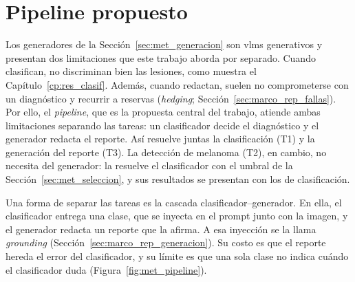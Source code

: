 \section{Pipeline propuesto}
\label{sec:met_pipeline}

Los generadores de la Sección~\ref{sec:met_generacion} son \glspl{vlm} generativos y presentan dos limitaciones que este
trabajo aborda por separado. Cuando clasifican, no discriminan bien las lesiones, como muestra el
Capítulo~\ref{cp:res_clasif}. Además, cuando redactan, suelen no comprometerse con un diagnóstico y recurrir a
reservas (\emph{hedging}; Sección~\ref{sec:marco_rep_fallas}). Por ello, el \emph{pipeline}, que es la propuesta central
del trabajo, atiende ambas limitaciones separando las tareas: un clasificador decide el diagnóstico y el generador
redacta el reporte.
Así resuelve juntas la clasificación (T1) y la generación del reporte (T3). La detección de melanoma (T2), en cambio, no
necesita del generador: la resuelve el clasificador con el umbral de la Sección~\ref{sec:met_seleccion}, y sus
resultados se presentan con los de clasificación.

Una forma de separar las tareas es la cascada clasificador--generador. En ella, el clasificador entrega una clase, que
se inyecta en el prompt junto con la imagen, y el generador redacta un reporte que la afirma. A esa inyección se
la llama \emph{grounding} (Sección~\ref{sec:marco_rep_generacion}). Su costo es que el reporte hereda el error del
clasificador, y su límite es que una sola clase no indica cuándo el clasificador duda
(Figura~\ref{fig:met_pipeline}).

